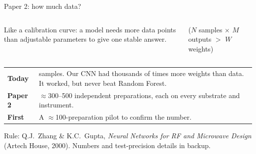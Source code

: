 \documentclass[aspectratio=169,10pt]{beamer}
\newcommand{\src}[1]{{\par\vspace{1pt}\tiny\color{cInk2}#1\par}}
\begin{document}
\begin{frame}{Paper 2: how much data?}
\begin{columns}[c,onlytextwidth]
\large Like a calibration curve: a model needs more data points than adjustable parameters to give one stable answer.

\medskip
\normalsize\textcolor{cInk2}{($N$ samples $\times$ $M$ outputs $>$ $W$ weights)}
\centering\scalebox{1.25}{}
\end{columns}

\bigskip
\renewcommand{\arraystretch}{1.5}
\begin{tabular}{@{}>{\bfseries}l>{\raggedright\arraybackslash}p{}@{}}
Today & 69 samples. Our CNN had thousands of times more weights than data. It worked, but never beat Random Forest.\\
Paper 2 & $\approx$300--500 independent preparations, each on every substrate and instrument.\\
First & A $\approx$100-preparation pilot to confirm the number.\\
\end{tabular}
\src{Rule: Q.J.\ Zhang \& K.C.\ Gupta, \emph{Neural Networks for RF and Microwave Design} (Artech House, 2000). Numbers and test-precision details in backup.}
\end{frame}
\end{document}

